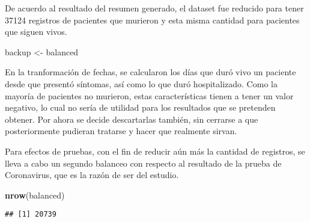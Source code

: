 \documentclass[]{article}
\newenvironment{Shaded}{\begin{snugshade}}{\end{snugshade}}
\newcommand{\KeywordTok}[1]{\textcolor[rgb]{0.13,0.29,0.53}{\textbf{#1}}}
\newcommand{\NormalTok}[1]{#1}
\newcommand{\OperatorTok}[1]{\textcolor[rgb]{0.81,0.36,0.00}{\textbf{#1}}}
\newcommand{\OtherTok}[1]{\textcolor[rgb]{0.56,0.35,0.01}{#1}}
\newcommand{\StringTok}[1]{\textcolor[rgb]{0.31,0.60,0.02}{#1}}
\begin{document}
De acuerdo al resultado del resumen generado, el dataset fue reducido
para tener 37124 registros de pacientes que murieron y esta misma
cantidad para pacientes que siguen vivos.

\begin{Shaded}
\begin{Highlighting}[]
\NormalTok{backup <-}\StringTok{ }\NormalTok{balanced}
\end{Highlighting}
\end{Shaded}

En la tranformación de fechas, se calcularon los días que duró vivo un
paciente desde que presentó síntomas, así como lo que duró
hospitalizado. Como la mayoría de pacientes no murieron, estas
características tienen a tener un valor negativo, lo cual no sería de
utilidad para los resultados que se pretenden obtener. Por ahora se
decide descartarlas también, sin cerrarse a que posteriormente pudieran
tratarse y hacer que realmente sirvan.

Para efectos de pruebas, con el fin de reducir aún más la cantidad de
registros, se lleva a cabo un segundo balanceo con respecto al resultado
de la prueba de Coronavirus, que es la razón de ser del estudio.

\begin{Shaded}
\end{Shaded}

\begin{Shaded}
\begin{Highlighting}[]
\KeywordTok{nrow}\NormalTok{(balanced)}
\end{Highlighting}
\end{Shaded}

\begin{verbatim}
## [1] 20739
\end{verbatim}

\begin{Shaded}
\end{Shaded}
\end{document}
